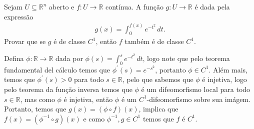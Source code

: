 \begin{homeworkProblem}[Seção 1-4]
  Sejam $U\subseteq\mathbb{R}^{n}$ aberto e $f:U\to\mathbb{R}$ contínua. A função $g:U\to\mathbb{R}$ é dada pela expressão
  \begin{align*}
    g(x)=\int_{0}^{f(x)}e^{-t^{2}}\,dt.
  \end{align*}
  Provar que se $g$ é de classe $C^{1}$, então $f$ também é de classe $C^{1}$. 
  \begin{solution}
    Defina $\phi:\mathbb{R}\to\mathbb{R}$ dada por $\phi(s)=\int_{0}^{s}e^{-t^{2}}\,dt$, logo note que pelo teorema fundamental del cálculo temos que $\phi^{\prime}(s)=e^{-s^{2}}$, portanto $\phi\in C^{1}$. Além mais, temos que $\phi^{\prime}(s)>0$ para todo $s\in\mathbb{R}$, pelo que sabemos que $\phi$ é injetiva, logo pelo teorema da função inversa temos que $\phi$ é um difeomorfismo local para todo $s\in\mathbb{R}$, mas como $\phi$ é injetiva, então $\phi$ é um $C^{1}$-difeomorfismo sobre sua imágem. Portanto, temos que $g(x)=(\phi\circ f)(x)$, implica que $f(x)=(\phi^{-1}\circ g)(x)$ e como $\phi^{-1},g\in C^{1}$ temos que $f$ é $C^{1}$. 
  \end{solution}
\end{homeworkProblem}

